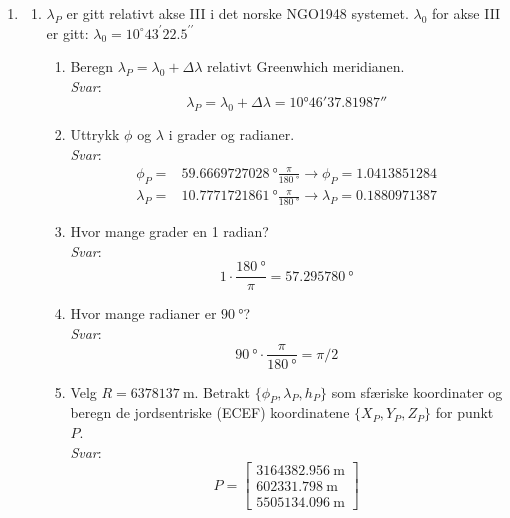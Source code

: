 \documentclass[a4paper, norsk, 11pt, twoside]{article}
\begin{document}
\begin{enumerate}
\item 
  \begin{enumerate}
  \item $\lambda_{P}$ er gitt relativt akse III i det norske NGO1948 systemet. $\lambda_{0}$ for akse III er gitt: $\lambda_{0}=10^{\circ}43^{\prime}22.5^{\prime\prime}$
    \begin{enumerate}
    \item Beregn $\lambda_{P}= \lambda_{0} + \Delta\lambda$ relativt Greenwhich meridianen.\\
    \textit{Svar}:
    \begin{equation*}
      \lambda_{P}=\lambda_{0} + \Delta\lambda=\ang{10;46;37.81987}
    \end{equation*}
    
    \item Uttrykk $\phi$ og $\lambda$ i grader og radianer.\\
    \textit{Svar}:
    \begin{align*}
      \phi_{P}=&\SI{59.6669727028}{\degree}\frac{\pi}{\SI{180}{\degree}} \rightarrow  \phi_{P}=1.0413851284 \\
      \lambda_{P}=&\SI{10.7771721861}{\degree}\frac{\pi}{\SI{180}{\degree}} \rightarrow  \lambda_{P}=0.1880971387
    \end{align*}
    
    \item Hvor mange grader en 1 radian?\\
    \textit{Svar}:
    \begin{equation*}
      1 \cdot \frac{\SI{180}{\degree}}{\pi}=\SI{57.295780}{\degree}
    \end{equation*}        
    
    \item Hvor mange radianer er $\SI{90}{\degree}$?\\
    \textit{Svar}:
    \begin{equation*}
       \SI{90}{\degree} \cdot \frac{\pi}{\SI{180}{\degree}}=\pi/2
    \end{equation*}
    
    \item Velg $R = \SI{6378137}{\meter}$. Betrakt $\{\phi_{P},\lambda_{P},h_{P}\}$ som sfæriske koordinater og beregn de jordsentriske (ECEF) koordinatene $\{X_{P},Y_{P},Z_{P}\}$ for punkt $P$.\\
   \textit{Svar}:
   \begin{equation*}
     P=
     \begin{bmatrix}
       \SI{3164382.956}{\meter}\\
       \SI{602331.798}{\meter}\\
       \SI{5505134.096}{\meter}
     \end{bmatrix}
   \end{equation*} 
    

\end{enumerate}
\end{enumerate}
\end{enumerate}
\end{document}
